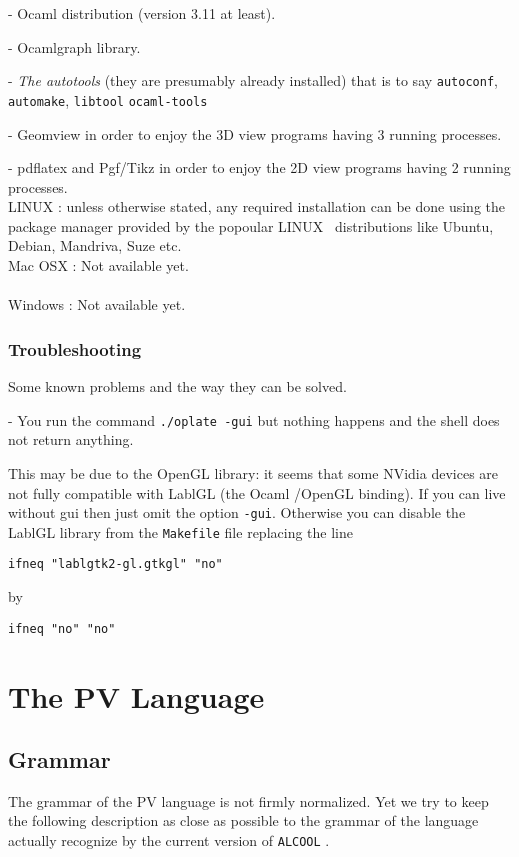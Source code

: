 \documentclass[article,11pt]{amsbook}
\def\alcool{\texttt{ALCOOL} }
\def\linux{{\sf LINUX} }
\def\macosx{{\sf Mac OSX} }
\def\windows{{\sf Windows} }
\def\nvidia{{\sf NVidia} }
\def\opengl{{\sf OpenGL} }
\def\lablgl{{\sf LablGL} }
\def\ocaml{{\sf Ocaml} }
\def\ocamlgraph{{\sf Ocamlgraph} }
\def\geomview{{\sf Geomview} }
\def\pgftikz{{\sf Pgf/Tikz} }
\def\pdflatex{{\sf pdflatex} }
\def\pv{{\sf PV} }
\begin{document}
 - \ocaml distribution (version 3.11 at least).

 - \ocamlgraph library.

 - {\em The autotools} (they are presumably already installed)
   that is to say \texttt{autoconf}, \texttt{automake}, \texttt{libtool}
   \texttt{ocaml-tools}

 - \geomview in order to enjoy the 3D view programs having 3
   running processes.

 - \pdflatex and \pgftikz in order to enjoy the 2D view programs
   having 2 running processes.\\

\noindent
\linux: unless otherwise stated, any required installation can be done
   using the package manager provided by the popoular \linux\
   distributions like {\sf Ubuntu}, {\sf Debian}, {\sf Mandriva}, {\sf
   Suze} etc.\\

\noindent
\macosx: Not available yet.\\\ \\
\windows: Not available yet.
%
\subsection{Troubleshooting}Some known problems and the way they can be
solved.

\noindent
 - You run the command \texttt{./oplate -gui} but nothing happens and
   the shell does not return anything.

This may be due to the \opengl library: it seems that some \nvidia
devices are not fully compatible with \lablgl (the \ocaml/\opengl
binding). If you can live without gui then just omit the option
\texttt{-gui}. Otherwise you can disable the \lablgl library from the
\texttt{Makefile} file replacing the line

\texttt{ifneq "lablgtk2-gl.gtkgl" "no"} 

\noindent by 

\texttt{ifneq "no" "no"}

\chapter{The PV Language}
\section{Grammar}
The grammar of the \pv language is not firmly normalized. Yet we try to
keep the following description as close as possible to the grammar of
the language actually recognize by the current version of \alcool\!.
\end{document}
